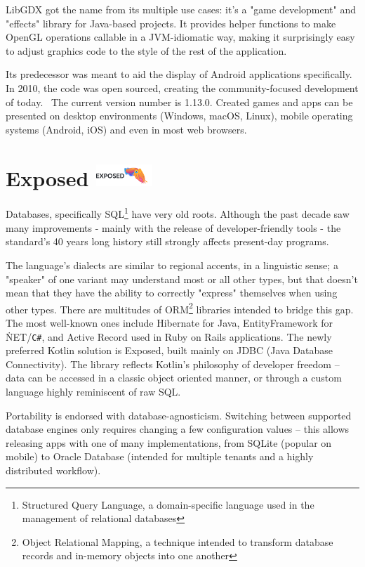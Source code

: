 LibGDX got the name from its multiple use cases: it's a "game development" and "effects" library for Java-based projects. It provides helper functions to make OpenGL operations callable in a JVM-idiomatic way, making it surprisingly easy to adjust graphics code to the style of the rest of the application.

Its predecessor was meant to aid the display of Android applications specifically. In 2010, the code was open sourced, creating the community-focused development of today.~\cite{LibgdxHistory} The current version number is 1.13.0. Created games and apps can be presented on desktop environments (Windows, macOS, Linux), mobile operating systems (Android, iOS) and even in most web browsers.

\section{Exposed {\hspace{1cm}\includegraphics[height=8mm, keepaspectratio]{images/exposed_logo.png}}}

Databases, specifically SQL\footnote{Structured Query Language, a domain-specific language used in the management of relational databases} have very old roots. Although the past decade saw many improvements - mainly with the release of developer-friendly tools - the standard's 40 years long history still strongly affects present-day programs.


The language's dialects are similar to regional accents, in a linguistic sense; a "speaker" of one variant may understand most or all other types, but that doesn't mean that they have the ability to correctly "express" themselves when using other types. There are multitudes of ORM\footnote{Object Relational Mapping, a technique intended to transform database records and in-memory objects into one another} libraries intended to bridge this gap. The most well-known ones include Hibernate for Java, EntityFramework for \.NET/\texttt{C\#}, and Active Record used in Ruby on Rails applications. The newly preferred Kotlin solution is Exposed, built mainly on JDBC (Java Database Connectivity). The library reflects Kotlin's philosophy of developer freedom -- data can be accessed in a classic object oriented manner, or through a custom language highly reminiscent of raw SQL.~\cite{ExposedDocs}


Portability is endorsed with database-agnosticism. Switching between supported database engines only requires changing a few configuration values -- this allows releasing apps with one of many implementations, from SQLite (popular on mobile) to Oracle Database (intended for multiple tenants and a highly distributed workflow).

